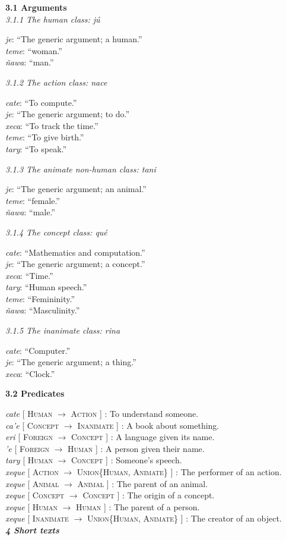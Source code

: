 \documentclass{article}[10pt]
\newcommand{\define}[4]{\emph{#1} [ \textsc{#2} $\rightarrow$ \textsc{#3} ] : #4. \\}
\newcommand{\defarg}[2]{\emph{#1}: ``#2.''\\}
\begin{document}
{\bf 3.1 Arguments}\\

\emph{3.1.1 The human class: \emph{j\'{u}}}
\begin{multicols}{3}
\noindent
\defarg{je}{The generic argument; a human}
\defarg{teme}{woman}
\defarg{\~{n}awa}{man}
\end{multicols}

\emph{3.1.2 The action class: \emph{nace}}
\begin{multicols}{3}
\noindent
\defarg{cate}{To compute}
\defarg{je}{The generic argument; to do}
\defarg{xeca}{To track the time}
\defarg{teme}{To give birth}
\defarg{tary}{To speak}
\end{multicols}

\emph{3.1.3 The animate non-human class: \emph{tani}}
\begin{multicols}{3}
\noindent
\defarg{je}{The generic argument; an animal}
\defarg{teme}{female}
\defarg{\~{n}awa}{male}
\end{multicols}

\emph{3.1.4 The concept class: \emph{qu\'{e}}}
\begin{multicols}{3}
\noindent
\defarg{cate}{Mathematics and computation}
\defarg{je}{The generic argument; a concept}
\defarg{xeca}{Time}
\defarg{tary}{Human speech}
\defarg{teme}{Femininity}
\defarg{\~{n}awa}{Masculinity}
\end{multicols}

\emph{3.1.5 The inanimate class: \emph{rina}}
\begin{multicols}{3}
\noindent
\defarg{cate}{Computer}
\defarg{je}{The generic argument; a thing}
\defarg{xeca}{Clock}
\end{multicols}

{\bf 3.2 Predicates}

\noindent
\define{cate}{Human}{Action}{To understand someone}
\define{ca'e}{Concept}{Inanimate}{A book about something}
\define{eri}{Foreign}{Concept}{A language given its name}
\define{'e}{Foreign}{Human}{A person given their name}
\define{tary}{Human}{Concept}{Someone's speech}
\define{xeque}{Action}{Union\{Human, Animate\}}{The performer of an action}
\define{xeque}{Animal}{Animal}{The parent of an animal}
\define{xeque}{Concept}{Concept}{The origin of a concept}
\define{xeque}{Human}{Human}{The parent of a person}
\define{xeque}{Inanimate}{Union\{Human, Animate\}}{The creator of an object}

\clearpage
{\bf \emph{4 Short texts}}\\
\end{document}
